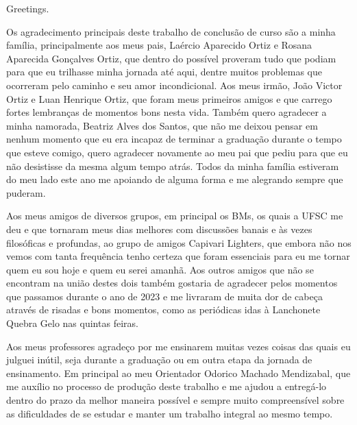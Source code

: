


\begin{agradecimentos}

\lang
{
    Greetings.
}
{
    Os agradecimento principais deste trabalho de conclusão de curso são a minha
    família, principalmente aos meus pais, Laércio Aparecido Ortiz e Rosana
    Aparecida Gonçalves Ortiz, que dentro do possível proveram tudo que podiam
    para que eu trilhasse minha jornada até aqui, dentre muitos problemas que
    ocorreram pelo caminho e seu amor incondicional. Aos meus irmão, João Victor
    Ortiz e Luan Henrique Ortiz, que foram meus primeiros amigos e que carrego
    fortes lembranças de momentos bons nesta vida. Também quero agradecer a minha
    namorada, Beatriz Alves dos Santos, que não me deixou pensar em nenhum momento
    que eu era incapaz de terminar a graduação durante o tempo que esteve comigo,
    quero agradecer novamente ao meu pai que pediu para que eu não desistisse da
    mesma algum tempo atrás. Todos da minha família estiveram do meu lado este ano
    me apoiando de alguma forma e me alegrando sempre que puderam.

	Aos meus amigos de diversos grupos, em principal os BMs, os quais a UFSC me deu
	e que tornaram meus dias melhores com discussões banais e às vezes filosóficas e
	profundas, ao grupo de amigos Capivari Lighters, que embora não nos vemos com
	tanta frequência tenho certeza que foram essenciais para eu me tornar quem eu sou
	hoje e quem eu serei amanhã. Aos outros amigos que não se encontram na união destes
	dois também gostaria de agradecer pelos momentos que passamos durante o ano de
	2023 e me livraram de muita dor de cabeça através de risadas e bons momentos, como
	as periódicas idas à Lanchonete Quebra Gelo nas quintas feiras.
	
	Aos meus professores agradeço por me ensinarem muitas vezes coisas das quais
	eu julguei inútil, seja durante a graduação ou em outra etapa da jornada de ensinamento.
	Em principal ao meu Orientador Odorico Machado Mendizabal, que me auxílio no processo
	de produção deste trabalho e me ajudou a entregá-lo dentro do prazo da melhor maneira
	possível e sempre muito compreensível sobre as dificuldades de se estudar e manter um
	trabalho integral ao mesmo tempo.
}
\end{agradecimentos}


%
%
%
